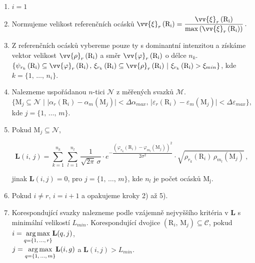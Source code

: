 \begin{enumerate}
\item $i = 1$

\item Normujeme velikost referenčních ocásků $\vv{\xi}_r\left( \mathrm{R_i} \right) = \dfrac{\vv{\xi}_r\left( \mathrm{R_i} \right)}{\max \left( \vv{\xi}_r\left( \mathrm{R_i} \right) \right)}\,.$

\item Z referenčních ocásků vybereme pouze ty s dominantní intenzitou a získáme vektor velikost $\vv{\rho}_{r}\left(\mathrm{R_i}\right)$ a směr $\vv{\varphi}_{r}\left(\mathrm{R_i}\right)$ o délce $n_k$.\\ $\lbrace \psi_{r_k}\left(\mathrm{R_i}\right) \subseteq \vv{\varphi}_{r}\left(\mathrm{R_i}\right),\, \xi_{r_k}\left(\mathrm{R_i}\right) \subseteq \vv{\rho}_{r}\left(\mathrm{R_i}\right)\,|\,\, \xi_{r_k}\left(\mathrm{R_i}\right) > \xi_{min} \rbrace$, kde $k =\lbrace 1,\,\dots,\,n_i\rbrace $.

\item Nalezneme uspořádanou $n$-tici $\mathcal{N}$ z měřených svazků $\mathcal{M}$. \\$\lbrace \mathrm{M}_j \subseteq \mathcal{N} \,\,|\,\,|\alpha_r(\mathrm{R}_i) - \alpha_m(\mathrm{M}_j) | < \Delta\alpha_{max},\, |\varepsilon_r(\mathrm{R}_i) - \varepsilon_m(\mathrm{M}_j) | < \Delta\varepsilon_{max} \rbrace$, kde $j =\lbrace 1,\,\dots,\,m \rbrace $.


\item Pokud $ \mathrm{M}_j \subseteq \mathcal{N}$, 

\begin{equation}
\mathbf{L}(i,\,j) = \overset{n_k}{\underset{{k = 1}}{\sum}}\, \overset{n_l}{\underset{{l = 1}}{\sum}}\,\dfrac{1}{\sqrt{2\pi}\, \sigma}\cdot e^{-\dfrac{\left(\varphi_{r_k}(\mathrm{R}_i)- \varphi_{m_l}(\mathrm{M}_j) \right)^2}{2\sigma^2}} \cdot \sqrt{\rho_{r_k}(\mathrm{R}_i)\, \rho_{m_l}(\mathrm{M}_j)}\,,
\label{eq:L_tails}
\end{equation}

  
jinak $\mathbf{L}(i,j) = 0$, pro $j =\lbrace 1,\,\dots,\,m \rbrace $, kde $n_l$ je počet ocásků $\mathrm{M_j}$.
  

\item Pokud $i \neq r$, $i = i+1$ a opakujeme kroky 2) až 5).

\item Korespondující svazky nalezneme podle vzájemně nejvyššího kritéria v $\mathbf{L}$ s minimální velikostí $L_{min}$. Korespondující dvojice $\left(\mathrm{R}_i,\,\mathrm{M}_j \right) \subseteq \mathcal{C}$, pokud  $i = \underset{{q = \lbrace1,\,\dots,\,r\rbrace}}{\operatorname*{arg\,max}}\mathbf{L}(q,j)$,\\ $j = \underset{{q = \lbrace1,\,\dots,\,m\rbrace}}{\operatorname*{arg\,max}}\mathbf{L}(i,g)$ a  $\mathbf{L}(i,j) > L_{min}$. 

\end{enumerate}

